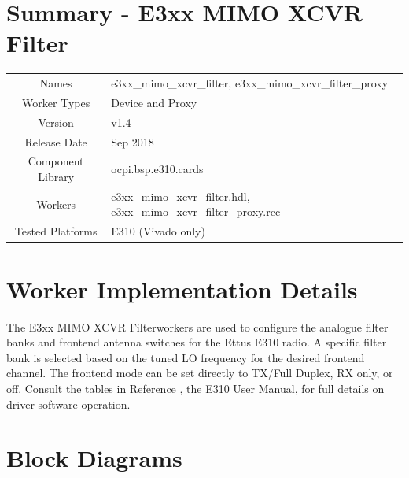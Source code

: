 \documentclass{article}
\author{} %
\date{Version \docVersion} %
\title{\docTitle}
\def\docVersion{1.4}
\def\comp{e3xx\_mimo\_xcvr\_filter}
\def\proxy{e3xx\_mimo\_xcvr\_filter\_proxy}
\def\Comp{E3xx MIMO XCVR Filter and Proxy }
\def\comp{e3xx\_mimo\_xcvr\_filter}
\def\Comp{E3xx MIMO XCVR Filter}
\begin{document}
\section*{Summary - \Comp}
\begin{tabular}{|c|M{13.5cm}|}
	\hline
	                  &                                      \\
	\hline
	Names              & \comp, \proxy                        \\
	\hline
	Worker Types       & Device and Proxy \\
	\hline
	Version           & v\docVersion \\
	\hline
	Release Date      & Sep 2018 \\
	\hline
	Component Library & ocpi.bsp.e310.cards   \\
	\hline
	Workers           & \comp.hdl, \proxy.rcc                \\
	\hline
	Tested Platforms  & E310 (Vivado only)                       \\
	\hline
\end{tabular}

\section*{Worker Implementation Details}
The \Comp workers are used to configure the analogue filter banks and frontend antenna switches for the Ettus E310 radio. A specific filter bank is selected based on the tuned LO frequency for the desired frontend channel. The frontend mode can be set directly to TX/Full Duplex, RX only, or off. Consult the tables in Reference \cite{usermanual}, the E310 User Manual, for full details on driver software operation.
\section*{Block Diagrams}
\end{document}
